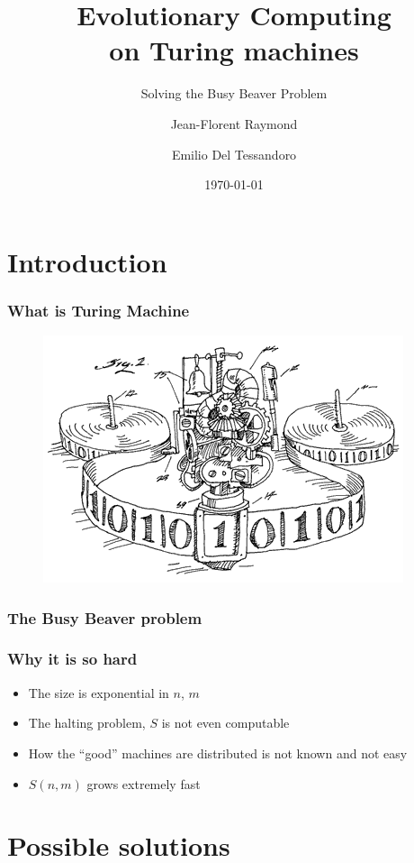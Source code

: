 \documentclass{beamer}
\title{\textbf{Evolutionary Computing\\on Turing machines}}
\subtitle{Solving the Busy Beaver Problem}
\author{Jean-Florent Raymond \and Emilio Del Tessandoro}
\institute[Uppsala University]{Uppsala University}
\date{\today}
\begin{document}
\begin{frame}
\titlepage
\end{frame}

\section{Introduction}

\begin{frame}
\frametitle{What is Turing Machine}
\begin{figure}
\includegraphics[scale=0.5]{figures/turingMachine.png}
\end{figure}
\end{frame}

\begin{frame}
\frametitle{The Busy Beaver problem}
\end{frame}

\begin{frame}
\frametitle{Why it is so hard}
\begin{itemize}
\item The size is exponential in $n$, $m$
\item The halting problem, $S$ is not even computable
\item How the ``good'' machines are distributed is not known and not easy
\item $S(n,m)$ grows extremely fast
\end{itemize}
\end{frame}

\section{Possible solutions}
\end{document}
